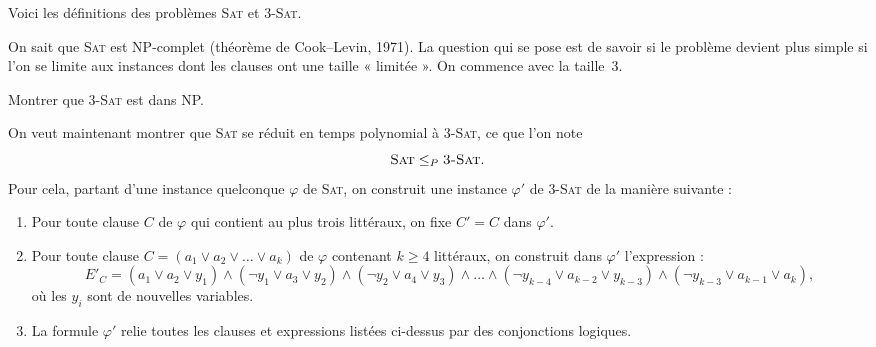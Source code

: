
\begingroup

\begin{exercice}

  Voici les définitions des problèmes \textsc{Sat} et \textsc{3-Sat}.


  On sait que \textsc{Sat} est NP-complet (théorème de Cook–Levin, 1971).  
  La question qui se pose est de savoir si le problème devient plus simple si l’on se limite aux instances dont les clauses ont une taille « limitée ».  
  On commence avec la taille~3.


  \begin{questions}
    \item Montrer que \textsc{3-Sat} est dans NP.

    \medskip
    On veut maintenant montrer que \textsc{Sat} se réduit en temps polynomial à \textsc{3-Sat}, ce que l’on note
    \[
    \textsc{Sat} \le_P \textsc{3-Sat}.
    \]
    Pour cela, partant d’une instance quelconque $\varphi$ de \textsc{Sat}, on construit une instance $\varphi'$ de \textsc{3-Sat} de la manière suivante :
    \begin{enumerate}
    \item Pour toute clause $C$ de $\varphi$ qui contient au plus trois littéraux, on fixe $C' = C$ dans $\varphi'$.
    \item Pour toute clause $C = (a_1 \lor a_2 \lor \dots \lor a_k)$ de $\varphi$ contenant $k \ge 4$ littéraux,
      on construit dans $\varphi'$ l’expression :
      \[
      E'_C = (a_1 \lor a_2 \lor y_1)
      \land (\neg y_1 \lor a_3 \lor y_2)
      \land (\neg y_2 \lor a_4 \lor y_3)
      \land \dots
      \land (\neg y_{k-4} \lor a_{k-2} \lor y_{k-3})
      \land (\neg y_{k-3} \lor a_{k-1} \lor a_k),
      \]
      où les $y_i$ sont de nouvelles variables.
    \item La formule $\varphi'$ relie toutes les clauses et expressions listées ci-dessus par des conjonctions logiques.
    \end{enumerate}


\end{questions}
\end{exercice}

